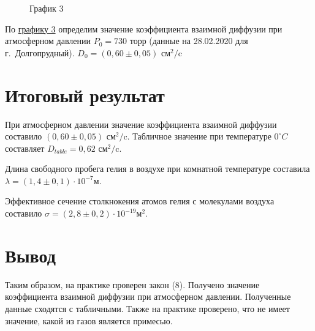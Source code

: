\documentclass[a4paper]{article}
\begin{document}
\begin{figure}[h!]
\caption*{График 3}
\label{gr3}
\end{figure}

По \hyperref[gr3]{графику 3} определим значение коэффициента взаимной диффузии при атмосферном давлении $P_0 = 730$ торр (данные на 28.02.2020 для г.~Долгопрудный). $D_0 = (0,60 \pm 0,05)$ см$^2 /$c

\section{Итоговый результат}
При атмосферном давлении значение коэффициента взаимной диффузии составило $(0,60 \pm 0,05)$ см$^2 /$c. Табличное значение при температуре $0^\circ C$ составляет $D_{table} = 0,62$ см$^2 /$c.

Длина свободного пробега гелия в воздухе при комнатной температуре составила $\lambda = (1,4 \pm 0,1) \cdot 10^{-7}$м.

Эффективное сечение столкнокения атомов гелия с молекулами воздуха составило $\sigma = (2,8 \pm 0,2) \cdot 10^{-19}$м$^2$.




\section{Вывод}
Таким образом, на практике проверен закон (8). Получено значение коэффициента взаимной диффузии при атмосферном давлении. Полученные данные сходятся с табличными. Также на практике проверено, что не имеет значение, какой из газов является примесью.
\end{document}
